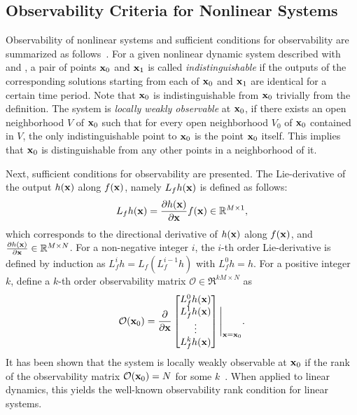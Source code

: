 \subsection{Observability Criteria for Nonlinear Systems}



Observability of nonlinear systems and sufficient conditions for observability are summarized as follows~\cite{HerKreITAC77,Nijvan90}. For a given nonlinear dynamic system described with  and , a pair of points $\mathbf{x}_0$ and $\mathbf{x}_1$ is called \textit{indistinguishable} if the outputs of the corresponding solutions starting from each of $\mathbf{x}_0$ and $\mathbf{x}_1$ are identical for a certain time period. Note that $\mathbf{x}_0$ is indistinguishable from $\mathbf{x}_0$ trivially from the definition. The system is \textit{locally weakly observable} at $\mathbf{x}_0$, if there exists an open neighborhood $V$ of $\mathbf{x}_0$ such that for every open neighborhood $V_0$ of $\mathbf{x}_0$ contained in $V$, the only indistinguishable point to $\mathbf{x}_0$ is the point $\mathbf{x}_0$ itself. This implies that $\mathbf{x}_0$ is distinguishable from any other points in a neighborhood of it.

Next, sufficient conditions for observability are presented. The Lie-derivative of the output $h(\mathbf{x})$ along $f(\mathbf{x})$, namely $L_f h(\mathbf{x})$ is defined as follows:
\begin{align*}
L_f h(\mathbf{x}) = \frac{\partial h(\mathbf{x})}{\partial \mathbf{x}}f(\mathbf{x})\in\mathbb{R}^{M\times 1},
\end{align*}
which corresponds to the directional derivative of $h(\mathbf{x})$ along $f(\mathbf{x})$, and $\frac{\partial h(\mathbf{x})}{\partial \mathbf{x}}\in\mathbb{R}^{M\times N}$. For a non-negative integer $i$, the $i$-th order Lie-derivative is defined by induction as $L_f^i h = L_f (L_f^{i-1} h)$ with $L_f^0 h = h$. For a positive integer $k$, define a $k$-th order observability matrix $\mathcal{O}\in\Re^{kM\times N}$ as
\begin{align*}
\mathcal{O}(\mathbf{x}_0) = \frac{\partial }{\partial \mathbf{x}} \begin{bmatrix} L_f^0 h(\mathbf{x}) \\ L_f^1 h(\mathbf{x})\\ \vdots \\L_f^{k} h(\mathbf{x})\end{bmatrix}\Bigg|_{\mathbf{x}=\mathbf{x}_0}.
\end{align*}
It has been shown that the system is locally weakly observable at $\mathbf{x}_0$ if the rank of the observability matrix $\mathcal{O}(\mathbf{x}_0) = N$ for some $k$~\cite{HerKreITAC77,Nijvan90}. When applied to linear dynamics, this yields the well-known observability rank condition for linear systems. 

